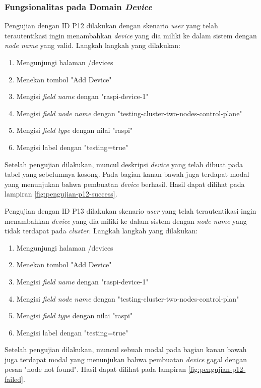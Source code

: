 \subsubsection{Fungsionalitas pada Domain \textit{Device}}

Pengujian dengan ID P12 dilakukan dengan skenario \textit{user} yang telah terautentikasi ingin menambahkan \textit{device} yang dia miliki ke dalam sistem dengan \textit{node name} yang valid. Langkah langkah yang dilakukan:
\begin{enumerate}
  \item Mengunjungi halaman /devices
  \item Menekan tombol "Add Device"
  \item Mengisi \textit{field name} dengan "raspi-device-1"
  \item Mengisi \textit{field node name} dengan "testing-cluster-two-nodes-control-plane"
  \item Mengisi \textit{field type} dengan nilai "raspi"
  \item Mengisi label dengan "testing=true"
\end{enumerate}

Setelah pengujian dilakukan, muncul deskripsi \textit{device} yang telah dibuat pada tabel yang sebelumnya kosong. Pada bagian kanan bawah juga terdapat modal yang menunjukan bahwa pembuatan \textit{device} berhasil. Hasil dapat dilihat pada lampiran \ref{fig:pengujian-p12-success}.

Pengujian dengan ID P13 dilakukan skenario \textit{user} yang telah terautentikasi ingin menambahkan \textit{device} yang dia miliki ke dalam sistem dengan \textit{node name} yang tidak terdapat pada \textit{cluster}. Langkah langkah yang dilakukan:
\begin{enumerate}
  \item Mengunjungi halaman /devices
  \item Menekan tombol "Add Device"
  \item Mengisi \textit{field name} dengan "raspi-device-1"
  \item Mengisi \textit{field node name} dengan "testing-cluster-two-nodes-control-plan"
  \item Mengisi \textit{field type} dengan nilai "raspi"
  \item Mengisi label dengan "testing=true"
\end{enumerate}

Setelah pengujian dilakukan, muncul sebuah modal pada bagian kanan bawah juga terdapat modal yang menunjukan bahwa pembuatan \textit{device} gagal dengan pesan "node not found". Hasil dapat dilihat pada lampiran \ref{fig:pengujian-p12-failed}.

